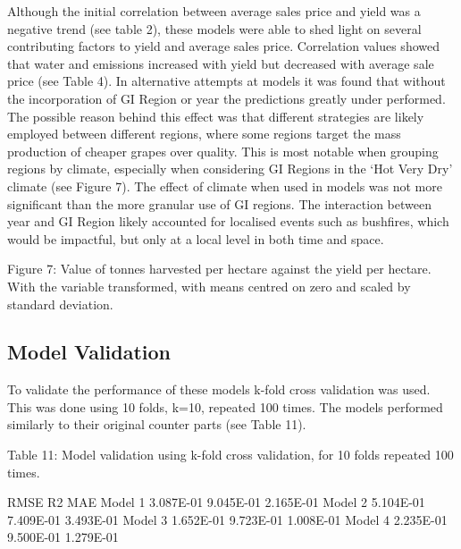 \documentclass[
  journal=large,
  manuscript=article-type,
  year=2023,
  volume=?,
]{cup-journal}
\begin{document}
Although the initial correlation between average sales price and yield was a negative trend (see table 2), these models were able to shed light on several contributing factors to yield and average sales price. Correlation values showed that water and emissions increased with yield but decreased with average sale price (see Table 4). In alternative attempts at models it was found that without the incorporation of GI Region or year the predictions greatly under performed. The possible reason behind this effect was that different strategies are likely employed between different regions, where some regions target the mass production of cheaper grapes over quality. This is most notable when grouping regions by climate, especially when considering GI Regions in the ‘Hot Very Dry’ climate (see Figure 7). The effect of climate when used in models was not more significant than the more granular use of GI regions. The interaction between year and GI Region likely accounted for localised events such as bushfires, which would be impactful, but only at a local level in both time and space.

Figure 7: Value of tonnes harvested per hectare against the yield per hectare. With the variable transformed, with means centred on zero and scaled by standard deviation.

\subsection{Model Validation}
To validate the performance of these models k-fold cross validation was used. This was done using 10 folds, k=10, repeated 100 times. The models performed similarly to their original counter parts (see Table 11).

Table 11: Model validation using k-fold cross validation, for 10 folds repeated 100 times.

RMSE
R2
MAE
Model 1
3.087E-01
9.045E-01
2.165E-01
Model 2
5.104E-01
7.409E-01
3.493E-01
Model 3
1.652E-01
9.723E-01
1.008E-01
Model 4
2.235E-01
9.500E-01
1.279E-01
\end{document}
